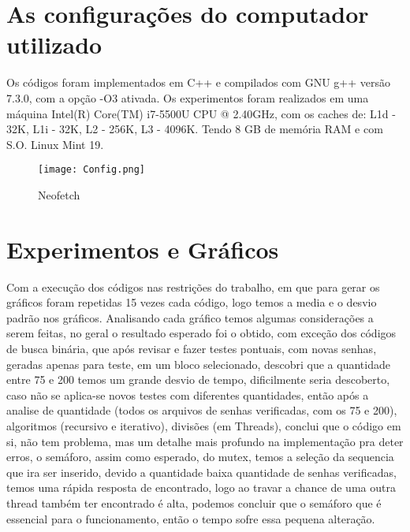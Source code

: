 \documentclass[10pt,journal,compsoc]{IEEEtran}
\begin{document}
\section{As configurações do computador utilizado}
Os códigos foram implementados em C++ e compilados com GNU g++ versão 7.3.0, com a opção -O3 ativada.
Os experimentos foram realizados em uma máquina Intel(R) Core(TM) i7-5500U CPU @ 2.40GHz, com os caches de: L1d - 32K, L1i - 32K, L2 - 256K, L3 - 4096K. Tendo 8 GB de memória RAM e com S.O. Linux Mint 19.

\begin{figure}[!ht]
	\texttt{[image: Config.png]}
	\caption{Neofetch}
	\label{fig_sim}
\end{figure}

\section{Experimentos e Gráficos}
Com a execução dos códigos nas restrições do trabalho, em que para gerar os gráficos foram repetidas 15 vezes cada código, logo temos a media e o desvio padrão nos gráficos.
Analisando cada gráfico temos algumas considerações a serem feitas, no geral o resultado esperado foi o obtido, com exceção dos códigos de busca binária, que após revisar e fazer testes pontuais, com novas senhas, geradas apenas para teste, em um bloco selecionado, descobri que a quantidade entre 75 e 200 temos um grande desvio de tempo, dificilmente seria descoberto, caso não se aplica-se novos testes com diferentes quantidades, então após a analise de quantidade (todos os arquivos de senhas verificadas, com os 75 e 200), algoritmos (recursivo e iterativo), divisões (em Threads), conclui que o código em si, não tem problema, mas um detalhe mais profundo na implementação pra deter erros, o semáforo, assim como esperado, do mutex, temos a seleção da sequencia que ira ser inserido, devido a quantidade baixa quantidade de senhas verificadas, temos uma rápida resposta de encontrado, logo ao travar a chance de uma outra thread também ter encontrado é alta, podemos concluir que o semáforo que é essencial para o funcionamento, então o tempo sofre essa pequena alteração.
\end{document}
